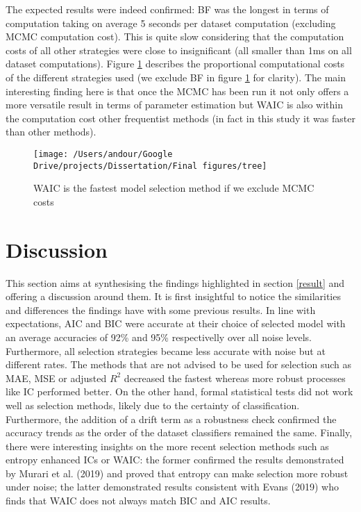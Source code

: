 \documentclass[12pt,]{article}
\begin{document}
The expected results were indeed confirmed: BF was the longest in terms of computation taking on average 5 seconds per dataset computation (excluding MCMC computation cost). This is quite slow considering that the computation costs of all other strategies were close to insignificant (all smaller than 1ms on all dataset computations). Figure \ref{fig:treemap} describes the proportional computational costs of the different strategies used (we exclude BF in figure \ref{fig:treemap} for clarity). The main interesting finding here is that once the MCMC has been run it not only offers a more versatile result in terms of parameter estimation but WAIC is also within the computation cost other frequentist methods (in fact in this study it was faster than other methods).

\begin{figure}

{\centering \texttt{[image: /Users/andour/Google Drive/projects/Dissertation/Final figures/tree]} 

}

\caption{WAIC is the fastest model selection method if we exclude MCMC costs}\label{fig:treemap}
\end{figure}

\hypertarget{discussion}{%
\section{Discussion}\label{discussion}}

This section aims at synthesising the findings highlighted in section \ref{result} and offering a discussion around them. It is first insightful to notice the similarities and differences the findings have with some previous results. In line with expectations, AIC and BIC were accurate at their choice of selected model with an average accuracies of 92\% and 95\% respectivelly over all noise levels. Furthermore, all selection strategies became less accurate with noise but at different rates. The methods that are not advised to be used for selection such as MAE, MSE or adjusted \(R^2\) decreased the fastest whereas more robust processes like IC performed better. On the other hand, formal statistical tests did not work well as selection methods, likely due to the certainty of classification. Furthermore, the addition of a drift term as a robustness check confirmed the accuracy trends as the order of the dataset classifiers remained the same. Finally, there were interesting insights on the more recent selection methods such as entropy enhanced ICs or WAIC: the former confirmed the results demonstrated by Murari et al. (2019) and proved that entropy can make selection more robust under noise; the latter demonstrated results consistent with Evans (2019) who finds that WAIC does not always match BIC and AIC results.
\end{document}
